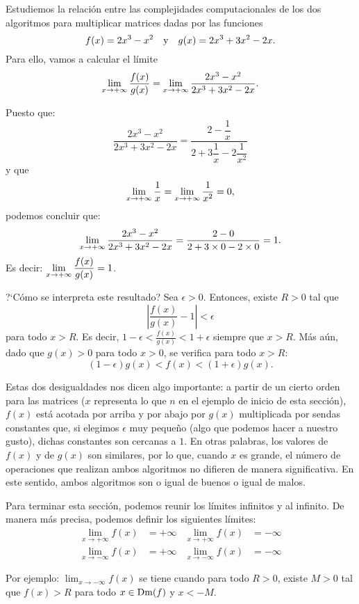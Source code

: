 \begin{exemplo}[Solución]{%
Estudiemos la relación entre las complejidades computacionales de los dos algoritmos para
multiplicar matrices dadas por las funciones
\[
f(x) = 2x^3 - x^2 \yjc g(x) = 2x^3 + 3x^2 - 2x.
\]
}%
Para ello, vamos a calcular el límite
\[
\limjc{\frac{f(x)}{g(x)}}{x}{+\infty} = \limjc{\frac{2x^3 - x^2}{2x^3 + 3x^2 - 2x}}{x}{+\infty}.
\]

Puesto que:
\[
\frac{2x^3 - x^2}{2x^3 + 3x^2 - 2x} = \dfrac{2 - \dfrac{1}{x}}{2 + 3\dfrac{1}{x} - 2\dfrac{1}{x^2}}
\]
y que
\[
\limjc{\frac{1}{x}}{x}{+\infty} = \limjc{\frac{1}{x^2}}{x}{+\infty} = 0,
\]
podemos concluir que:
\[
\limjc{\frac{2x^3 - x^2}{2x^3 + 3x^2 - 2x}}{x}{+\infty} = \frac{2 - 0}{2 + 3\times 0 - 2\times 0}
= 1.
\]
Es decir: $\displaystyle\limjc{\frac{f(x)}{g(x)}}{x}{+\infty} = 1$.

?`Cómo se interpreta este resultado?
Sea $\epsilon > 0$. Entonces, existe $R > 0$ tal que
\[
\left\lvert\frac{f(x)}{g(x)} - 1\right\rvert < \epsilon
\]
para todo $x > R$. Es decir,
$
\displaystyle
1 - \epsilon < \frac{f(x)}{g(x)} < 1 + \epsilon
$
siempre que $x > R$. Más aún, dado que $g(x) > 0$ para todo $x > 0$, se verifica para todo $x > R$:
\[
(1 - \epsilon)g(x) < f(x) < (1 + \epsilon)g(x).
\]


Estas dos desigualdades nos dicen algo importante: a partir de un cierto orden para las matrices
($x$ representa lo que $n$ en el ejemplo de inicio de esta sección), $f(x)$ está acotada por arriba
y por abajo por $g(x)$ multiplicada por sendas constantes que, si elegimos $\epsilon$ muy pequeño
(algo que podemos hacer a nuestro gusto), dichas constantes son cercanas a $1$. En otras palabras,
los valores de $f(x)$ y de $g(x)$ son similares, por lo que, cuando $x$ es grande, el número de
operaciones que realizan ambos algoritmos no difieren de manera significativa. En este sentido,
ambos algoritmos son o igual de buenos o igual de malos.
\end{exemplo}

Para terminar esta sección, podemos reunir los límites infinitos y al infinito. De manera más
precisa, podemos definir los siguientes límites:
\begin{align*}
\lim_{x \to +\infty}f(x) & = +\infty & \lim_{x \to +\infty}f(x) & = -\infty \\
\lim_{x \to -\infty}f(x) & = +\infty & \lim_{x \to -\infty}f(x) & = -\infty
\end{align*}

Por ejemplo: $\displaystyle \lim_{x \to -\infty}f(x)$ se tiene cuando para todo $R > 0$, existe $M
> 0$ tal que
$\displaystyle
f(x) > R
$
para todo $x\in\Dm(f)$ y $x < -M$.

